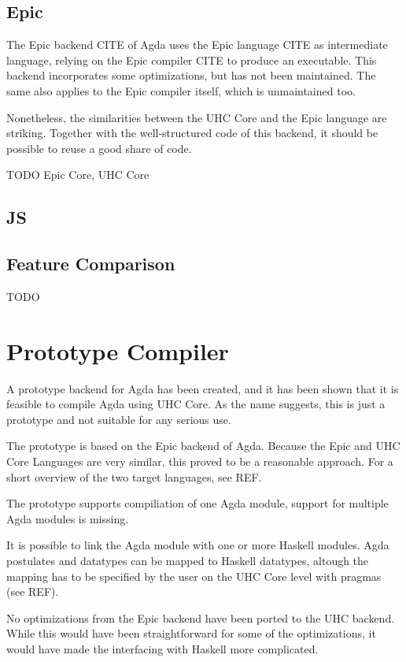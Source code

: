 \documentclass[12pt, a4paper, twoside]{report}
\begin{document}
\section{Epic}
The Epic backend CITE of Agda uses the Epic language CITE as intermediate language, relying on the Epic
compiler CITE to produce an executable. This backend incorporates some optimizations, but has not been
maintained. The same also applies to the Epic compiler itself, which is unmaintained too.

Nonetheless, the similarities between the UHC Core and the Epic language are striking. Together with
the well-structured code of this backend, it should be possible to reuse a good share of code.

TODO Epic Core, UHC Core

\section{JS}

\section{Feature Comparison}
TODO

\chapter{Prototype Compiler}
A prototype backend for Agda has been created, and it has been shown that it is feasible to compile
Agda using UHC Core. As the name suggests, this is just a prototype and not suitable for any serious use.

The prototype is based on the Epic backend of Agda. Because the Epic and UHC Core Languages are
very similar, this proved to be a reasonable approach. For a short overview of the two target
languages, see REF.

The prototype supports compiliation of one Agda module, support for multiple Agda modules is missing.

It is possible to link the Agda module with one or more Haskell modules. Agda postulates
and datatypes can be mapped to Haskell datatypes, altough the mapping has to be specified
by the user on the UHC Core level with pragmas (see REF).

No optimizations from the Epic backend have been ported to the UHC backend. While this
would have been straightforward for some of the optimizations, it would have made the
interfacing with Haskell more complicated.
\end{document}
